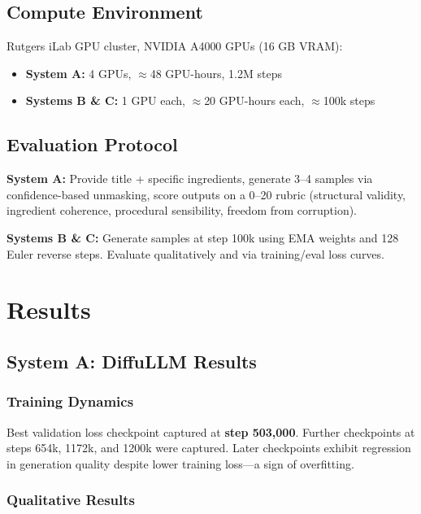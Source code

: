 \documentclass[11pt,a4paper]{article}
\begin{document}
\subsection{Compute Environment}

Rutgers iLab GPU cluster, NVIDIA A4000 GPUs (16 GB VRAM):
\begin{itemize}[nosep]
  \item \textbf{System A:} 4 GPUs, $\approx$48 GPU-hours, 1.2M steps
  \item \textbf{Systems B \& C:} 1 GPU each, $\approx$20 GPU-hours each, $\approx$100k steps
\end{itemize}

\subsection{Evaluation Protocol}

\textbf{System A:} Provide title + specific ingredients, generate 3--4 samples via confidence-based unmasking, score outputs on a 0--20 rubric (structural validity, ingredient coherence, procedural sensibility, freedom from corruption).

\textbf{Systems B \& C:} Generate samples at step 100k using EMA weights and 128 Euler reverse steps. Evaluate qualitatively and via training/eval loss curves.

\section{Results}

\subsection{System A: DiffuLLM Results}

\subsubsection*{Training Dynamics}

Best validation loss checkpoint captured at \textbf{step 503,000}. Further checkpoints at steps 654k, 1172k, and 1200k were captured. Later checkpoints exhibit regression in generation quality despite lower training loss---a sign of overfitting.

\subsubsection*{Qualitative Results}
\end{document}
